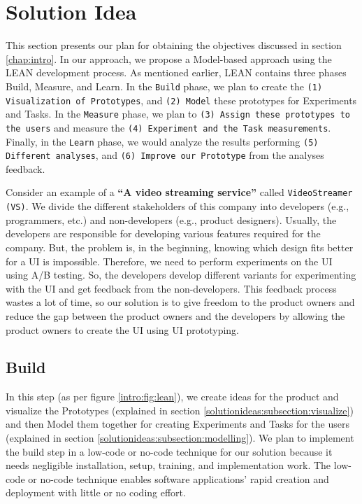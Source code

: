 \chapter{Solution Idea} \label{chap:solutionideas}

This section presents our plan for obtaining the objectives discussed in section \ref{chap:intro}. 
In our approach, we propose a Model-based approach using the LEAN development process. 
As mentioned earlier, LEAN contains three phases Build, Measure, and Learn.
In the \texttt{Build} phase, we plan to create the \texttt{(1) Visualization of Prototypes}, and \texttt{(2) Model} these prototypes for Experiments and Tasks.
In the \texttt{Measure} phase, we plan to \texttt{(3) Assign these prototypes to the users} and measure the \texttt{(4) Experiment and the Task measurements}.
Finally, in the \texttt{Learn} phase, we would analyze the results performing \texttt{(5) Different analyses}, and \texttt{(6) Improve our Prototype} from the analyses feedback.  

Consider an example of a \textbf{``A video streaming service''} called \texttt{VideoStreamer (VS)}.
We divide the different stakeholders of this company into developers (e.g., programmers, etc.) and non-developers (e.g., product designers).
Usually, the developers are responsible for developing various features required for the company. 
But, the problem is, in the beginning, knowing which design fits better for a UI is impossible. 
Therefore, we need to perform experiments on the UI using A/B testing.
So, the developers develop different variants for experimenting with the UI and get feedback from the non-developers.
This feedback process wastes a lot of time, so our solution is to give freedom to the product owners and reduce the gap between the product owners and the developers by allowing the product owners to create the UI using UI prototyping.

\section{Build}
In this step (as per figure \ref{intro:fig:lean}), we create ideas for the product and visualize the Prototypes (explained in section \ref{solutionideas:subsection:visualize}) and then Model them together for creating Experiments and Tasks for the users (explained in section \ref{solutionideas:subsection:modelling}).
We plan to implement the build step in a low-code or no-code technique for our solution because it needs negligible installation, setup, training, and implementation work.
The low-code or no-code technique enables software applications' rapid creation and deployment with little or no coding effort.

